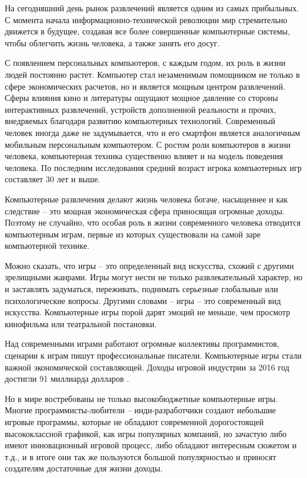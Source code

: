 \newpage
{}
{}

На сегодняшний день рынок развлечений является одним из самых прибыльных. С момента начала информационно-технической революции мир стремительно движется в будущее, создавая все более совершенные компьютерные системы, чтобы облегчить жизнь человека, а также занять его досуг.

С появлением персональных компьютеров, с каждым годом, их роль в жизни людей постоянно растет. Компьютер стал незаменимым помощником не только в сфере экономических расчетов, но и является мощным центром развлечений. Сферы влияния кино и литературы ощущают мощное давление со стороны интерактивных развлечений, устройств дополненной реальности и прочих, внедряемых благодаря развитию компьютерных технологий. Современный человек иногда даже не задумывается, что и его смартфон является аналогичным мобильным персональным компьютером. С ростом роли компьютеров в жизни человека, компьютерная техника существенно влияет и на модель поведения человека. По последним исследования средний возраст игрока компьютерных игр составляет 30 лет и выше.

Компьютерные развлечения делают жизнь человека богаче, насыщеннее и как следствие -- это мощная экономическая сфера приносящая огромные доходы.
Поэтому не случайно, что особая роль в жизни современного человека отводится компьютерным играм, первые из которых существовали на самой заре компьютерной технике.

Можно сказать, что игры -- это определенный вид искусства, схожий с другими зрелищными жанрами. Игры могут нести не только развлекательный характер, но и заставлять задуматься, переживать, поднимать серьезные глобальные или психологические вопросы. Другими словами -- игры -- это современный вид искусства. Компьютерные игры порой дарят эмоций не меньше, чем просмотр кинофильма или театральной постановки.

Над современными играми работают огромные коллективы программистов, сценарии к играм пишут профессиональные писатели. Компьютерные игры стали важной экономической составляющей. Доходы игровой индустрии за 2016 год достигли 91 миллиарда долларов \cite{GameDevRevenues}.

Но в мире востребованы не только высокобюджетные компьютерные игры. Многие программисты-любители -- инди-разработчики создают небольшие игровые программы, которые не обладают современной дорогостоящей высококлассной графикой, как игры популярных компаний, но зачастую либо имеют инновационный игровой процесс, либо обладают интересным сюжетом и т.д., и в итоге они так же пользуются большой популярностью и приносят создателям достаточные для жизни доходы.

